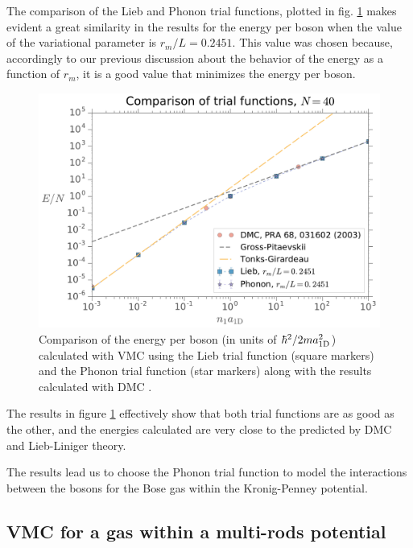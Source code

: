The comparison of the Lieb and Phonon trial functions, plotted in fig.
\ref{fig:comparison-energy-as-n-a1d-nb-40} makes evident a great similarity in
the results for the energy per boson when the value of the variational parameter
is $r_m / L = 0.2451$. This value was chosen because, accordingly to our
previous discussion about the behavior of the energy as a function of $r_m$, it
is a good value that minimizes the energy per boson.
%
\begin{figure}[h!]
  \centering
  \includegraphics[width=0.75\linewidth]{./figures/comparison_energy-as-n-a1d_Nb-40}
  \caption{ Comparison of the energy per boson (in units of $\hbar^2 / 2 m
      a_{ \mathrm{1D} }^2$) calculated with VMC using the Lieb trial function (square
    markers) and the Phonon trial function (star markers) along with the results
    calculated with DMC \cite{bib:astrakharchik-phys-rev-a.68.031602.2003}. }
  \label{fig:comparison-energy-as-n-a1d-nb-40}
\end{figure}
%
The results in figure \ref{fig:comparison-energy-as-n-a1d-nb-40} effectively
show that both trial functions are as good as the other, and the energies
calculated are very close to the predicted by DMC and Lieb-Liniger theory.

The results  lead us to choose the Phonon trial function to model the
interactions between the bosons for the Bose gas within the Kronig-Penney
potential.



\subsection{VMC for a gas within a multi-rods potential}


